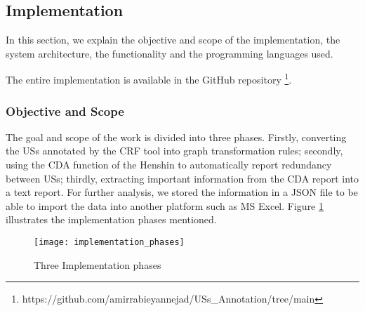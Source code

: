 \subsection{Implementation}\label{redundancy_implementation}
In this section, we explain the objective and scope of the implementation, the system architecture, the functionality and the programming languages used.

The entire implementation is available in the GitHub repository \footnote{https://github.com/amirrabieyannejad/USs\_Annotation/tree/main}.
\subsubsection*{Objective and Scope}
The goal and scope of the work is divided into three phases. Firstly, converting the USs annotated by the CRF tool into graph transformation rules; secondly, using the CDA function of the Henshin to automatically report redundancy between USs; thirdly, extracting important information from the CDA report into a text report. For further analysis, we stored the information in a JSON file to be able to import the data into another platform such as MS Excel.
Figure \ref{fig:implementation_phases} illustrates the implementation phases mentioned.
\begin{figure}[h]
	\centering
	\texttt{[image: implementation\_phases]}
	\caption{Three Implementation phases}\label{fig:implementation_phases}
\end{figure} 
